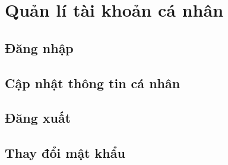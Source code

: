 \section{Quản lí tài khoản cá nhân}

\subsection{Đăng nhập}

\subsection{Cập nhật thông tin cá nhân} 

\subsection{Đăng xuất}

\subsection{Thay đổi mật khẩu} 